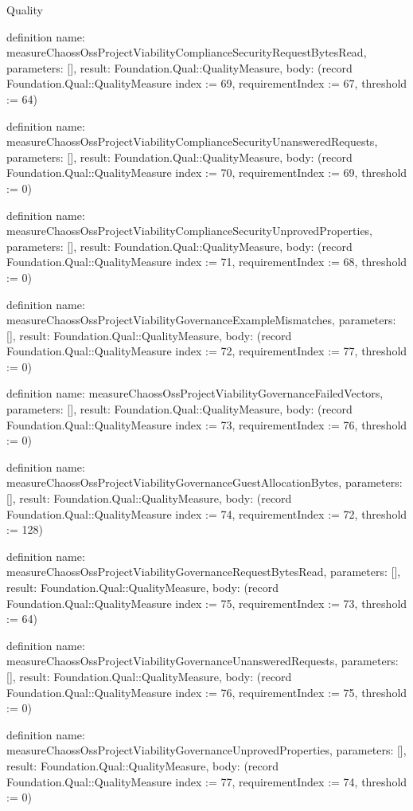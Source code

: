 \begin{lexlean}{Quality}
\begin{semanticmodule}
definition{
  name: measureChaossOssProjectViabilityComplianceSecurityRequestBytesRead,
  parameters: [],
  result: Foundation.Qual::QualityMeasure,
  body: (record Foundation.Qual::QualityMeasure {index := 69, requirementIndex := 67, threshold := 64})
}

definition{
  name: measureChaossOssProjectViabilityComplianceSecurityUnansweredRequests,
  parameters: [],
  result: Foundation.Qual::QualityMeasure,
  body: (record Foundation.Qual::QualityMeasure {index := 70, requirementIndex := 69, threshold := 0})
}

definition{
  name: measureChaossOssProjectViabilityComplianceSecurityUnprovedProperties,
  parameters: [],
  result: Foundation.Qual::QualityMeasure,
  body: (record Foundation.Qual::QualityMeasure {index := 71, requirementIndex := 68, threshold := 0})
}

definition{
  name: measureChaossOssProjectViabilityGovernanceExampleMismatches,
  parameters: [],
  result: Foundation.Qual::QualityMeasure,
  body: (record Foundation.Qual::QualityMeasure {index := 72, requirementIndex := 77, threshold := 0})
}

definition{
  name: measureChaossOssProjectViabilityGovernanceFailedVectors,
  parameters: [],
  result: Foundation.Qual::QualityMeasure,
  body: (record Foundation.Qual::QualityMeasure {index := 73, requirementIndex := 76, threshold := 0})
}

definition{
  name: measureChaossOssProjectViabilityGovernanceGuestAllocationBytes,
  parameters: [],
  result: Foundation.Qual::QualityMeasure,
  body: (record Foundation.Qual::QualityMeasure {index := 74, requirementIndex := 72, threshold := 128})
}

definition{
  name: measureChaossOssProjectViabilityGovernanceRequestBytesRead,
  parameters: [],
  result: Foundation.Qual::QualityMeasure,
  body: (record Foundation.Qual::QualityMeasure {index := 75, requirementIndex := 73, threshold := 64})
}

definition{
  name: measureChaossOssProjectViabilityGovernanceUnansweredRequests,
  parameters: [],
  result: Foundation.Qual::QualityMeasure,
  body: (record Foundation.Qual::QualityMeasure {index := 76, requirementIndex := 75, threshold := 0})
}

definition{
  name: measureChaossOssProjectViabilityGovernanceUnprovedProperties,
  parameters: [],
  result: Foundation.Qual::QualityMeasure,
  body: (record Foundation.Qual::QualityMeasure {index := 77, requirementIndex := 74, threshold := 0})
}


\end{semanticmodule}
\end{lexlean}
